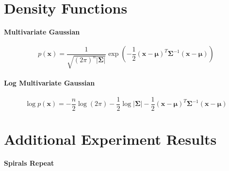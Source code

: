 \chapter{Density Functions}

\subsubsection{Multivariate Gaussian}

\begin{equation}
    p(\mathbf{x}) = \frac{1}{\sqrt{(2\pi)^n |\boldsymbol{\Sigma}|}} \exp\left(-\frac{1}{2} (\mathbf{x} - \boldsymbol{\mu})^T \boldsymbol{\Sigma}^{-1} (\mathbf{x} - \boldsymbol{\mu})\right)
    \label{eq:mvn}
\end{equation}

\subsubsection{Log Multivariate Gaussian}

\begin{equation}
    \log p(\mathbf{x}) = -\frac{n}{2} \log(2\pi) - \frac{1}{2} \log |\boldsymbol{\Sigma}| - \frac{1}{2} (\mathbf{x} - \boldsymbol{\mu})^T \boldsymbol{\Sigma}^{-1} (\mathbf{x} - \boldsymbol{\mu})
    \label{eq:log_mvn}
\end{equation}


\chapter{Additional Experiment Results}

\subsubsection{Spirals Repeat}
\label{sec:app_spirals}


